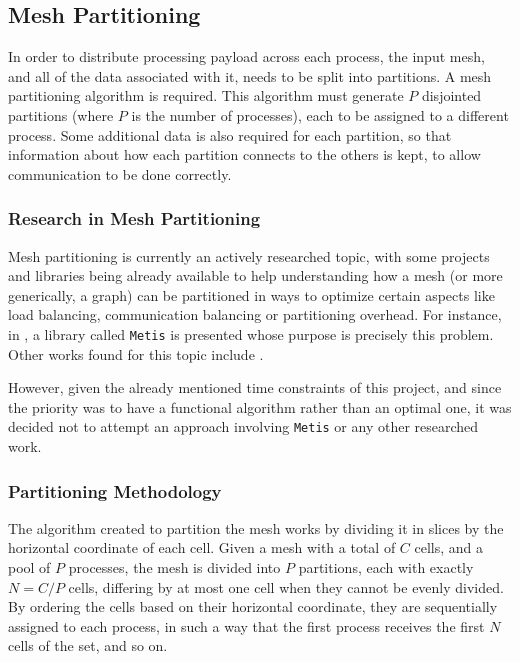 \subsection{Mesh Partitioning}
\label{subsec:mpi:partitioning}


In order to distribute processing payload across each process, the input mesh, and all of the data associated with it, needs to be split into partitions.
A mesh partitioning algorithm is required. This algorithm must generate $P$ disjointed partitions (where $P$ is the number of processes), each to be assigned to a different process.
Some additional data is also required for each partition, so that information about how each partition connects to the others is kept, to allow communication to be done correctly.

\subsubsection{Research in Mesh Partitioning}
\label{subsubsec:mpi:partitioning:research}

Mesh partitioning is currently an actively researched topic, with some projects and libraries being already available to help understanding how a mesh (or more generically, a graph) can be partitioned in ways to optimize certain aspects like load balancing, communication balancing or partitioning overhead.
For instance, in \cite{metis}, a library called \texttt{Metis} is presented whose purpose is precisely this problem. Other works found for this topic include \cite{gilbert1995, walshaw2000}.

However, given the already mentioned time constraints of this project, and since the priority was to have a functional algorithm rather than an optimal one, it was decided not to attempt an approach involving \texttt{Metis} or any other researched work.

\subsubsection{Partitioning Methodology}
\label{subsubsec:mpi:partitioning:method}

The algorithm created to partition the mesh works by dividing it in slices by the horizontal coordinate of each cell.
Given a mesh with a total of $C$ cells, and a pool of $P$ processes, the mesh is divided into $P$ partitions, each with exactly $N=C/P$ cells, differing by at most one cell when they cannot be evenly divided.
By ordering the cells based on their horizontal coordinate, they are sequentially assigned to each process, in such a way that the first process receives the first $N$ cells of the set, and so on.


